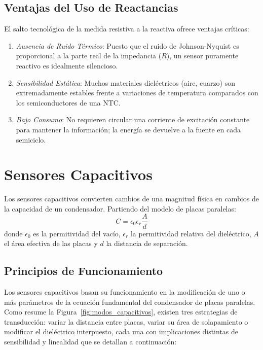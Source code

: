\subsection{Ventajas del Uso de Reactancias}
El salto tecnológica de la medida resistiva a la reactiva ofrece ventajas críticas:
\begin{enumerate}
    \item \emph{Ausencia de Ruido Térmico}: Puesto que el ruido de Johnson-Nyquist es proporcional a la parte real de la impedancia ($R$), un sensor puramente reactivo es idealmente silencioso.
    \item \emph{Sensibilidad Estática}: Muchos materiales dieléctricos (aire, cuarzo) son extremadamente estables frente a variaciones de temperatura comparados con los semiconductores de una NTC.
    \item \emph{Bajo Consumo}: No requieren circular una corriente de excitación constante para mantener la información; la energía se devuelve a la fuente en cada semiciclo.
\end{enumerate}

\section{Sensores Capacitivos}\label{sec:capacitivos}

Los sensores capacitivos convierten cambios de una magnitud física en cambios de la capacidad de un condensador. Partiendo del modelo de placas paralelas:
\begin{equation}\label{eq:capacidad_placas}
    C = \epsilon_0 \epsilon_r \frac{A}{d}
\end{equation}
donde $\epsilon_0$ es la permitividad del vacío, $\epsilon_r$ la permitividad relativa del dieléctrico, $A$ el área efectiva de las placas y $d$ la distancia de separación.

\subsection{Principios de Funcionamiento}

Los sensores capacitivos basan su funcionamiento en la modificación de uno o más parámetros de la ecuación fundamental del condensador de placas paralelas. Como resume la Figura~\ref{fig:modos_capacitivos}, existen tres estrategias de transducción: variar la distancia entre placas, variar su área de solapamiento o modificar el dieléctrico interpuesto, cada una con implicaciones distintas de sensibilidad y linealidad que se detallan a continuación:

